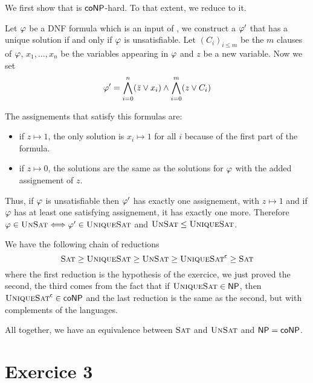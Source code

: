     We first show that \UniqueSAT is $\mathsf{coNP}$-hard.
    To that extent, we reduce \UnSAT to it.

    Let $\varphi$ be a DNF formula which is an input of \UnSAT,
    we construct a $\varphi'$ that has a unique solution if and only if 
    $\varphi$ is unsatisfiable. 
    Let $(C_i)_{i \leq m}$ be the $m$ clauses of $\varphi$,
    $x_1, \dots, x_n$ be the variables
    appearing in $\varphi$ and $z$ be a new variable.
    Now we set \[
        \varphi' = 
            \bigwedge_{i = 0}^n (\bar z \vee x_i)
            \wedge
            \bigwedge_{i = 0}^m (z \vee C_i)
    \]

    The assignements that satisfy this formulas are:
    \begin{itemize}
        \item if $z \mapsto 1$, the only solution is $x_i \mapsto 1$ for all $i$
            because of the first part of the formula.
        \item if $z \mapsto 0$, the solutions are the same as the solutions for $\varphi$
            with the added assignement of $z$.
    \end{itemize}

    Thus, if $\varphi$ is unsatisfiable then $\varphi'$ has exactly one assignement, with $z \mapsto 1$
    and if $\varphi$ has at least one satisfying assignement, it has exactly one more.
    Therefore $\varphi \in \textsc{UnSat} \Longleftrightarrow \varphi' \in \textsc{UniqueSat}$
    and $\textsc{UnSat} \leq \textsc{UniqueSat}$.

    We have the following chain of reductions \[
        \textsc{Sat} \geq \textsc{UniqueSat} \geq \textsc{UnSat} \geq \textsc{UniqueSat}^\mathsf{c} \geq \textsc{Sat}
    \]
    where the first reduction is the hypothesis of the exercice,
    we just proved the second, the third comes from the fact that 
    if $\textsc{UniqueSat} \in \mathsf{NP}$, then $\textsc{UniqueSat}^\mathsf{c} \in \mathsf{coNP}$
    and the last reduction is the same as the second, 
    but with complements of the languages.

    All together, we have an equivalence between $\textsc{Sat}$ and $\textsc{UnSat}$
    and $\mathsf{NP} = \mathsf{coNP}$.


    \section*{Exercice 3}

